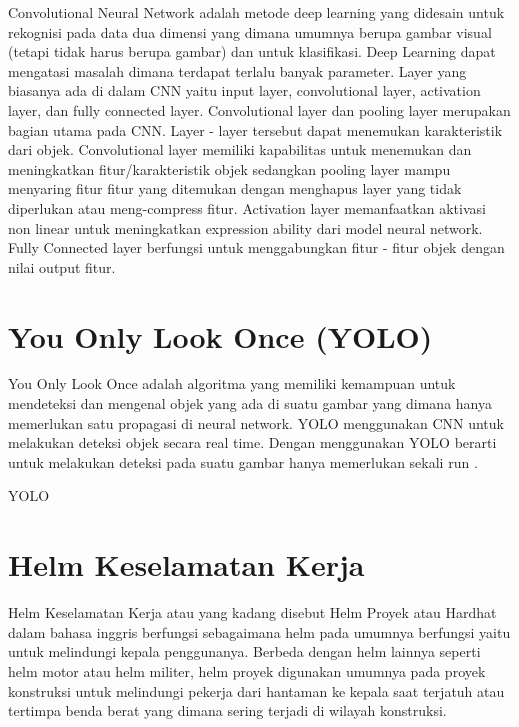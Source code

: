Convolutional Neural Network adalah metode deep learning yang didesain untuk rekognisi pada data dua dimensi yang dimana umumnya berupa gambar visual (tetapi tidak harus berupa gambar) dan untuk klasifikasi. Deep Learning dapat mengatasi masalah dimana terdapat terlalu banyak parameter.  Layer yang biasanya ada di dalam CNN yaitu input layer, convolutional layer, activation layer, dan fully connected layer.
Convolutional layer dan pooling layer merupakan bagian utama pada CNN. Layer - layer tersebut dapat menemukan karakteristik dari objek. Convolutional layer memiliki kapabilitas untuk menemukan dan meningkatkan fitur/karakteristik objek sedangkan pooling layer mampu menyaring fitur fitur yang ditemukan dengan menghapus layer yang tidak diperlukan atau meng-compress fitur. Activation layer memanfaatkan aktivasi non linear untuk meningkatkan expression ability dari model neural network. Fully Connected layer berfungsi untuk menggabungkan fitur - fitur objek dengan nilai output fitur. \cite{Goodfellow-et-al-2016}

\section{You Only Look Once (YOLO)}
\label{sec:youonlylookone}

You Only Look Once adalah algoritma yang memiliki kemampuan untuk mendeteksi dan mengenal 
objek yang ada di suatu gambar yang dimana hanya memerlukan satu propagasi di neural network. 
YOLO menggunakan CNN untuk melakukan deteksi objek secara real time. 
Dengan menggunakan YOLO berarti untuk melakukan deteksi pada suatu gambar hanya memerlukan 
sekali run .\cite{adiwibowo2020deteksi}

YOLO 


\section{Helm Keselamatan Kerja}
\label{sec:helmkeselamatankerja}

Helm Keselamatan Kerja atau yang kadang disebut Helm Proyek atau Hardhat  dalam bahasa inggris berfungsi sebagaimana helm pada umumnya berfungsi yaitu untuk melindungi kepala penggunanya. Berbeda dengan helm lainnya seperti helm motor atau helm militer, helm proyek digunakan umumnya pada proyek konstruksi untuk melindungi pekerja dari hantaman ke kepala saat terjatuh atau tertimpa benda berat yang dimana sering terjadi di wilayah konstruksi. \cite{safeopedia_2018}